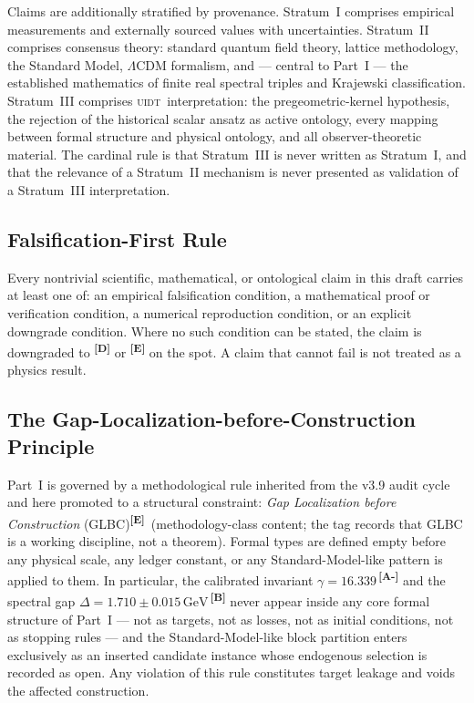 \documentclass[12pt,a4paper,twoside]{article}
\theoremstyle{plain}
\theoremstyle{definition}
\theoremstyle{remark}
\newcommand{\UIDT}{\textsc{uidt}}
\newcommand{\GeV}{\,\mathrm{GeV}}
\newcommand{\catmark}[1]{\textsuperscript{\textsf{\textbf{[#1]}}}}
\newcommand{\DeltaGap}{1.710 \pm 0.015\GeV} %
\newcommand{\GammaGeom}{16.339} %
\begin{document}
Claims are additionally stratified by provenance. Stratum~I comprises
empirical measurements and externally sourced values with uncertainties.
Stratum~II comprises consensus theory: standard quantum field theory,
lattice methodology, the Standard Model, $\Lambda$CDM formalism, and ---
central to Part~I --- the established mathematics of finite real spectral
triples and Krajewski classification. Stratum~III comprises \UIDT\
interpretation: the pregeometric-kernel hypothesis, the rejection of the historical scalar ansatz as active ontology,
every mapping between formal structure and physical ontology, and all
observer-theoretic material. The cardinal rule is that Stratum~III is
never written as Stratum~I, and that the relevance of a Stratum~II
mechanism is never presented as validation of a Stratum~III
interpretation.

\subsection{Falsification-First Rule}
\label{subsec:falsification-first}

Every nontrivial scientific, mathematical, or ontological claim in this
draft carries at least one of: an empirical falsification condition, a
mathematical proof or verification condition, a numerical reproduction
condition, or an explicit downgrade condition. Where no such condition can
be stated, the claim is downgraded to \catmark{D} or \catmark{E} on the
spot. A claim that cannot fail is not treated as a physics result.

\subsection{The Gap-Localization-before-Construction Principle}
\label{subsec:glbc}

Part~I is governed by a methodological rule inherited from the v3.9 audit
cycle and here promoted to a structural constraint: \emph{Gap Localization
before Construction} (GLBC)\catmark{E}\ (methodology-class content; the
tag records that GLBC is a working discipline, not a theorem). Formal
types are defined empty before any physical scale, any ledger constant, or
any Standard-Model-like pattern is applied to them. In particular, the
calibrated invariant $\gamma = \GammaGeom$\,\catmark{A-} and the spectral
gap $\Delta = \DeltaGap$\,\catmark{B} never appear inside any core formal
structure of Part~I --- not as targets, not as losses, not as initial
conditions, not as stopping rules --- and the Standard-Model-like block
partition enters exclusively as an inserted candidate instance whose
endogenous selection is recorded as open. Any violation of this rule
constitutes target leakage and voids the affected construction.
\end{document}
